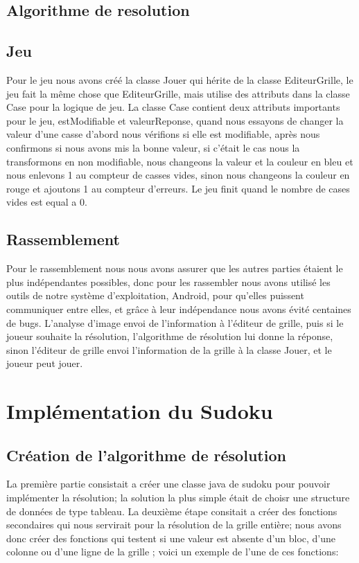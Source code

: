 \documentclass{article}
\begin{document}
\subsection{Algorithme de resolution}
\subsection{Jeu}
Pour le jeu nous avons créé la classe Jouer qui hérite de la classe EditeurGrille, le jeu fait la même chose que EditeurGrille, mais utilise des attributs dans la classe Case pour la logique de jeu. La classe Case contient deux attributs importants pour le jeu, estModifiable et valeurReponse,  quand nous essayons de changer la valeur d’une casse d’abord nous vérifions si elle est modifiable, après nous confirmons si nous avons mis la bonne valeur, si c'était le cas nous la transformons en non modifiable, nous changeons la valeur et la couleur en bleu et nous enlevons 1 au compteur de casses vides, sinon nous changeons la couleur en rouge et ajoutons 1 au compteur d’erreurs. Le jeu finit quand le nombre de cases vides est equal a 0.

\subsection{Rassemblement}
Pour le rassemblement nous nous avons assurer que les autres parties étaient le plus indépendantes possibles, donc pour les rassembler nous avons utilisé les outils de notre système d'exploitation, Android, pour qu’elles puissent communiquer entre elles, et grâce à leur indépendance nous avons évité centaines de bugs. L’analyse d’image envoi de l’information à l'éditeur de grille, puis si le joueur souhaite la résolution, l’algorithme de résolution lui donne la réponse, sinon l'éditeur de grille envoi l’information de la grille à la classe Jouer, et le joueur peut jouer.



\section{Implémentation du Sudoku}

\subsection{Création de l'algorithme de résolution}

La première partie consistait a créer une classe java de sudoku pour pouvoir implémenter la résolution; la solution la plus simple était de choisr une structure de données de type tableau.
\newline
\newline La deuxième étape consitait a créer des fonctions secondaires qui nous servirait pour la résolution de la grille entière; nous avons donc créer des fonctions qui testent si une valeur est absente d'un bloc, d'une colonne ou d'une ligne de la grille ; voici un exemple de l'une de ces fonctions:\\
\end{document}
